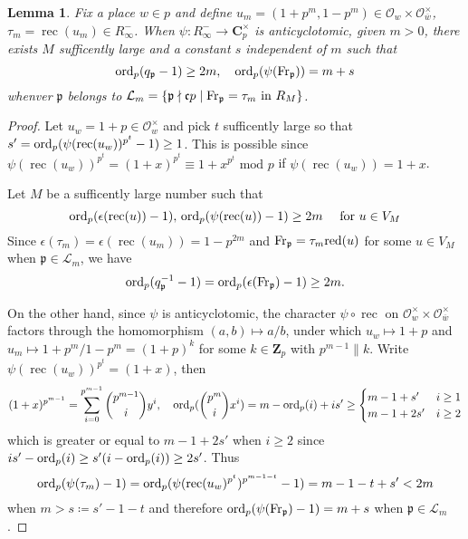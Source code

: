 \documentclass[leqno]{amsart}
\newtheorem{lem}[thm]{Lemma}
\theoremstyle{definition}
\theoremstyle{remark}
\newcommand{\oo}{\mathcal{O}}
\newcommand{\Zp}{\mathbf{Z}_p}
\newcommand{\C}{\mathbf C}
\DeclareMathOperator{\rec}{rec}
\newcommand{\Fr}{\textnormal{Fr}} %
\newcommand{\fc}{\mathfrak{c}}
\newcommand{\fp}{\mathfrak{p}}
\newcommand{\red}{\textnormal{red}}
\newcommand{\bw}{\overline{w}}
\newcommand{\ord}{\textnormal{ord}} %
\begin{document}
\begin{lem}\label{lem:estimate}
Fix a place $w\in p$ and
define $u_m=(1+p^m,1-p^m)\in \oo_w\times \oo_{\bw}^\times$,
$\tau_m=\rec(u_m)\in R_\infty^-$.
When $\psi\colon R_\infty^-\to \C_p^\times$
is anticyclotomic,
given $m>0$,
there exists  $M$ sufficently large
and a constant  $s$ independent of  $m$
such that 
\[
	\ord_p(q_\fp-1)\geq 2m,\quad
	\ord_p(\psi(\Fr_\fp))=m+s
\]
whenver $\fp$ belongs to 
$\mathcal{L}_m=
\{\fp\nmid \fc p\mid \Fr_\fp=\tau_m \text{ in } R_M\}$.
\end{lem}
\begin{proof}
Let $u_w=1+p\in \oo_w^\times$
and pick $t$ sufficently large so that
$s'=\ord_p(\psi(\rec(u_w))^{p^t}-1)\geq 1$.
This is possible since
$\psi(\rec(u_w))^{p^t}=(1+x)^{p^t}\equiv 
1+x^{p^t}\text{ mod }p$ if
$\psi(\rec(u_w))=1+x$.

Let $M$ be a sufficently large number such that
\[
	\ord_p(\epsilon(\rec(u))-1),\,
	\ord_p(\psi(\rec(u))-1)\geq 2m\quad
	\text{ for } u\in V_{M}
\]
Since 
$\epsilon(\tau_m)=\epsilon(\rec(u_m))=1-p^{2m}$
and $\Fr_\fp=\tau_m\red(u)$ for some $u\in V_M$
when $\fp\in \mathcal{L}_m$, we have 
\[
\ord_p(q_\fp^{-1}-1)=
\ord_p(\epsilon(\Fr_\fp)-1)\geq 2m.
\]

On the other hand,
since $\psi$ is anticyclotomic, the character
$\psi\circ \rec$ on $\oo_w^\times\times\oo_{\bw}^\times$
factors through the homomorphism $(a,b)\mapsto a/b$,
under which
$u_w\mapsto 1+p$ and
$u_m\mapsto 1+p^m/1-p^m=(1+p)^k$
for some $k\in \Zp$ with $p^{m-1}\parallel k$. 
Write $\psi(\rec(u_w))^{p^t}=(1+x)$, then
\[
	(1+x)^{p^{m-1}}=\sum_{i=0}^{p^{m-1}}
	\binom{p^{m-1}}{i}y^i,\quad
	\ord_p(\binom{p^m}{i}x^i)=m-\ord_p(i)+is'\geq
	\begin{cases}
		m-1+s'& i\geq 1\\
		m-1+2s' & i\geq 2
	\end{cases}
\]
which is greater or equal to $m-1+2s'$ when  $i\geq 2$
since  $is'-\ord_p(i)\geq s'(i-\ord_p(i))\geq 2s'$.
Thus 
\[
\ord_p(\psi(\tau_m)-1)=\ord_p(\psi(\rec(u_w)^{p^t})^{p^{m-1-t}}-1)
=m-1-t+s'<2m
\]
when $m>s\coloneqq s'-1-t$
and therefore
$\ord_p(\psi(\Fr_\fp)-1)=m+s$ when  $\fp\in\mathcal{L}_m$.
\end{proof}
\end{document}
